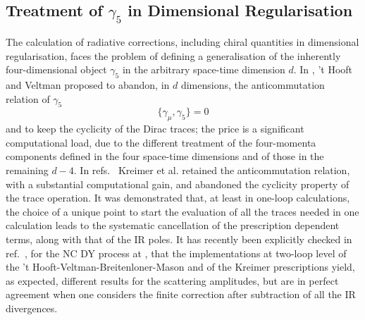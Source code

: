 \documentclass[11pt,a4paper]{article}
\begin{document}
\subsection{Treatment of \texorpdfstring{$\gamma_5$}{g5} in Dimensional Regularisation}
\label{sec:gamma5}

The calculation of radiative corrections, including chiral quantities in dimensional regularisation, faces the problem of defining a generalisation of
the inherently four-dimensional object  $\gamma_5$ in the arbitrary space-time dimension $d$.
% 
%
In \cite{'tHooft:1972fi}, 't Hooft and Veltman proposed to abandon, in $d$ dimensions, the anticommutation relation of $\gamma_5$
\begin{equation}
 \{\gamma_\mu,\gamma_5\} = 0
\end{equation}
and to keep the cyclicity of the Dirac traces; the price is a significant
computational load, due to the different treatment of the four-momenta
components defined in the four space-time dimensions and of those
in the remaining $d-4$.
In refs.~\cite{Kreimer:1989ke,Korner:1991sx}
Kreimer et al. retained the anticommutation relation, with a substantial computational gain, and abandoned the cyclicity property of the trace operation.
It was demonstrated that, at least in one-loop calculations, the choice of
a unique point to start the evaluation of  all the traces needed in one calculation
leads to the systematic cancellation of the prescription dependent terms,
along with that of the IR poles.
It has recently been explicitly checked in ref.~\cite{Heller:2020owb},
for the NC DY process at \oaas\!,
that the implementations at two-loop level of the 't Hooft-Veltman-Breitenloner-Mason and of the Kreimer prescriptions
yield, as expected, different results for the scattering amplitudes,
but are in perfect agreement when one considers the finite correction
after subtraction of all the IR divergences.
%
\end{document}
